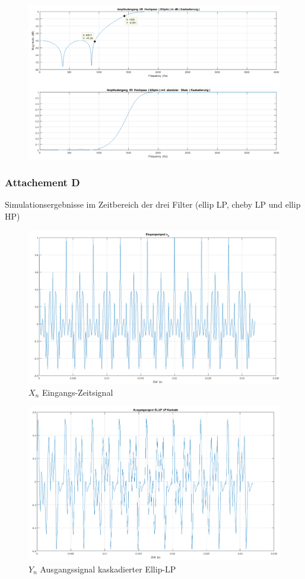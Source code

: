 \begin{figure}[h]
\centering
\includegraphics[width=0.7\linewidth]{Bilder/Attachment_B_ELLIP_KASKADE}
\caption{}
\label{fig:Attachment_B_ELLIP_KASKADE}
\end{figure}



\clearpage

\subsubsection{Attachement D}
Simulationsergebnisse im Zeitbereich der drei Filter (ellip LP, cheby LP und ellip HP)
\begin{figure}[h]
\centering
\includegraphics[width=0.7\linewidth]{Bilder/Attachment_D_Eingangszeitsignal}
\caption{$X_{n}$ Eingangs-Zeitsignal }
\label{fig:Attachment_D_Eingangszeitsignal}
\end{figure}

\begin{figure}[h]
\centering
\includegraphics[width=0.7\linewidth]{Bilder/Attachment_D_Ausgangssignal_ellip_lp}
\caption{$Y_{n}$ Ausgangssignal kaskadierter Ellip-LP}
\label{fig:Attachment_D_Ausgangssignal_ellip_lp}
\end{figure}

